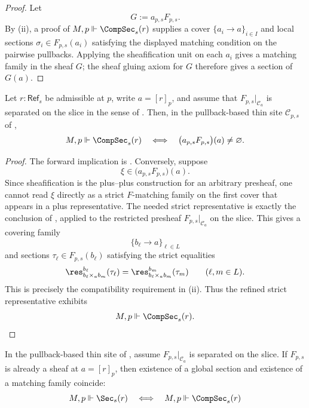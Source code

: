 \begin{proof}
Let
\[
G:=a_{p,s}F_{p,s}.
\]
By (ii), a proof of $M,p\Vdash\CompSec_s(r)$
supplies a cover $\{a_i\to a\}_{i\in I}$ and local sections
$\sigma_i\in F_{p,s}(a_i)$ satisfying the displayed matching condition on
the pairwise pullbacks. Applying the sheafification unit on each $a_i$
gives a matching family in the sheaf $G$; the sheaf gluing axiom for $G$
therefore gives a section of $G(a)$.
\end{proof}

\begin{theorem}\label{thm:sheafification-characterization}
Let $r:\mathsf{Ref}_s$ be admissible at $p$, write $a=[r]_p$, and assume that
$F_{p,s}|_{\mathcal C_a}$ is separated on the slice in the sense of
. Then, in the pullback-based thin
site $\mathcal C_{p,s}$ of ,
\[
M,p\Vdash \CompSec_s(r)
\quad\Longleftrightarrow\quad
\bigl(a_{p,s}F_{p,s}\bigr)(a)\neq\varnothing.
\]
\end{theorem}

\begin{proof}
The forward implication is .
Conversely, suppose
\[
\xi\in \bigl(a_{p,s}F_{p,s}\bigr)(a).
\]
Since sheafification is the plus--plus construction for an arbitrary
presheaf, one cannot read $\xi$ directly as a strict $F$-matching family
on the first cover that appears in a plus representative. The needed
strict representative is exactly the conclusion of
, applied to the restricted
presheaf \(F_{p,s}|_{\mathcal C_a}\) on the slice. This gives a covering family
\[
\{b_\ell\to a\}_{\ell\in L}
\]
and sections $\tau_\ell\in F_{p,s}(b_\ell)$ satisfying the strict
equalities
\[
\res_{b_\ell\times_a b_m}^{b_\ell}(\tau_\ell)
=
\res_{b_\ell\times_a b_m}^{b_m}(\tau_m)
\qquad(\ell,m\in L).
\]
This is precisely the compatibility requirement in
(ii). Thus the refined strict representative
exhibits
\[
M,p\Vdash \CompSec_s(r).
\]
\end{proof}

\begin{corollary}\label{cor:sheaf-local-to-global}
In the pullback-based thin site of , assume
$F_{p,s}|_{\mathcal C_a}$ is separated on the slice. If $F_{p,s}$ is already a
sheaf at $a=[r]_p$, then existence of a global section and existence of a matching family coincide:
\[
M,p\Vdash \Sec_s(r)
\quad\Longleftrightarrow\quad
M,p\Vdash \CompSec_s(r)
\]
\end{corollary}

